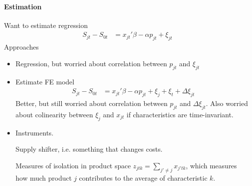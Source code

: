 \documentclass[12pt]{article}
\theoremstyle{plain}
\theoremstyle{definition}
\theoremstyle{remark}
\begin{document}
\clearpage
\paragraph{Estimation}
Want to estimate regression
\begin{align*}
  S_{jt}-S_{0t}
  &=
  x_{jt}'\beta - \alpha p_{jt} + \xi_{jt}
\end{align*}
Approaches
\begin{itemize}
  \item
    Regression, but worried about correlation between $p_{jt}$ and
    $\xi_{jt}$
  \item
    Estimate FE model
    \begin{align*}
      S_{jt}-S_{0t}
      &=
      x_{jt}'\beta - \alpha p_{jt}
      + \xi_{j}
      + \xi_{t}
      + \Delta \xi_{jt}
    \end{align*}
    Better, but still worried about correlation between $p_{jt}$ and
    $\Delta \xi_{jt}$.
    Also worried about colinearity between $\xi_j$ and $x_{jt}$ if
    characteristics are time-invariant.

  \item
    Instruments.

    Supply shifter, i.e. something that changes costs.

    Measures of isolation in product space
    $z_{jtk}=\sum_{j'\neq j}x_{j'tk}$, which measures how much product
    $j$ contributes to the average of characteristic $k$.
\end{itemize}
\end{document}
